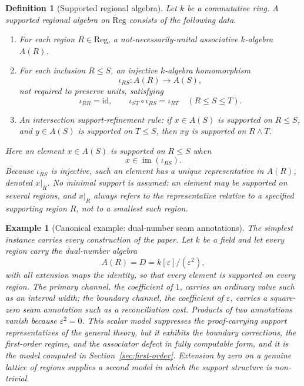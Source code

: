 \documentclass[11pt]{article}
\newtheorem{definition}[theorem]{Definition}
\newtheorem{example}[theorem]{Example}
\newcommand{\Reg}{\mathrm{Reg}}
\newcommand{\im}{\operatorname{im}}
\begin{document}
\begin{definition}[Supported regional algebra]
\label{def:supported-algebra}
Let \(k\) be a commutative ring. A supported regional algebra on \(\Reg\) consists of the following data.

\begin{enumerate}[label=(\roman*)]
\item For each region \(R\in \Reg\), a not-necessarily-unital associative \(k\)-algebra \(A(R)\).

\item For each inclusion \(R\leq S\), an injective \(k\)-algebra homomorphism
\[
\iota_{RS}:A(R)\to A(S),
\]
not required to preserve units, satisfying
\[
\iota_{RR}=\mathrm{id},
\qquad
\iota_{ST}\circ \iota_{RS}=\iota_{RT}
\quad (R\leq S\leq T).
\]

\item An intersection support-refinement rule: if \(x\in A(S)\) is supported on \(R\leq S\), and \(y\in A(S)\) is supported on \(T\leq S\), then \(xy\) is supported on \(R\wedge T\).
\end{enumerate}

Here an element \(x\in A(S)\) is supported on \(R\leq S\) when
\[
x\in \im(\iota_{RS}).
\]
Because \(\iota_{RS}\) is injective, such an element has a unique representative in \(A(R)\), denoted \(x\rvert_R\). No minimal support is assumed: an element may be supported on several regions, and \(x\rvert_R\) always refers to the representative relative to a specified supporting region \(R\), not to a smallest such region.
\end{definition}

\begin{example}[Canonical example: dual-number seam annotations]
\label{ex:canonical}
The simplest instance carries every construction of the paper. Let \(k\) be a field and let every region carry the dual-number algebra
\[
A(R)=D=k[\varepsilon]/(\varepsilon^2),
\]
with all extension maps the identity, so that every element is supported on every region. The primary channel, the coefficient of \(1\), carries an ordinary value such as an interval width; the boundary channel, the coefficient of \(\varepsilon\), carries a square-zero seam annotation such as a reconciliation cost. Products of two annotations vanish because \(\varepsilon^2=0\). This scalar model suppresses the proof-carrying support representatives of the general theory, but it exhibits the boundary corrections, the first-order regime, and the associator defect in fully computable form, and it is the model computed in Section~\ref{sec:first-order}. Extension by zero on a genuine lattice of regions supplies a second model in which the support structure is non-trivial.
\end{example}
\end{document}
